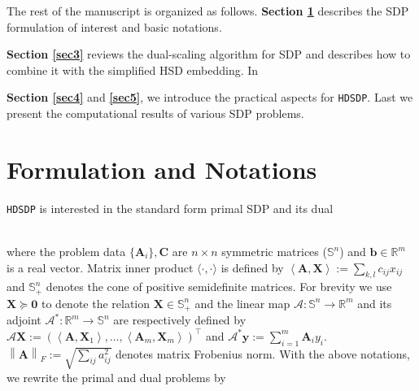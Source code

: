 The rest of the manuscript is organized as follows. \textbf{Section \ref{sec2}} 
describes the SDP formulation of interest and basic notations.
{\textbf{Section \ref{sec3}} reviews the dual-scaling algorithm for SDP
and describes how to combine it with the simplified HSD embedding. In {\textbf{Section
\ref{sec4}} and \textbf{\ref{sec5}}, we introduce the practical aspects for {{\texttt{HDSDP}}}. 
Last we present the computational results of various SDP problems.

\section{Formulation and Notations} \label{sec2}

{{\texttt{HDSDP}}} is interested in the standard form primal SDP and its dual

{}\\

where the problem data $\{\mathbf{A}_i\}, \mathbf{C}$ are $n \times n$ symmetric matrices
($\mathbb{S}^n$) and $\mathbf{b} \in \mathbb{R}^m$ is a real vector. Matrix inner
product $\langle \cdot, \cdot \rangle$ is defined by $\left\langle \mathbf{A}, \mathbf{X} \right\rangle := \sum_{k, l}
c_{i j} x_{i j}$ and $\mathbb{S}_+^n$ denotes the cone of positive
semidefinite matrices. For brevity we use $\mathbf{X} \succeq \textbf{0}$ to denote the
relation $\mathbf{X} \in \mathbb{S}_+^n$ and the linear map $\mathcal{A} : \mathbb{S}^n
\rightarrow \mathbb{R}^m$ and its adjoint $\mathcal{A}^{\ast} : \mathbb{R}^m
\rightarrow \mathbb{S}^n$ are respectively defined by $\mathcal{A} \mathbf{X} := \left(
\left\langle \mathbf{A}, \mathbf{X}_1 \right\rangle, \ldots, \left\langle \mathbf{A}_m, \mathbf{X}_m
\right\rangle \right)^{\top}$ and $\mathcal{A}^{\ast} \mathbf{y} := \sum_{i = 1}^m \mathbf{A}_i
y_i$. $\left\| \mathbf{A} \right\|_F := \sqrt{\sum_{i j} a_{i j}^2}$ denotes
matrix Frobenius norm. With the above notations, we rewrite the primal and
dual problems by

}}
